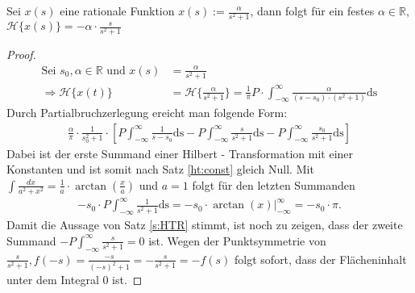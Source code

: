 \begin{lemma}\label{s:HTR} Sei $x(s)$ eine rationale Funktion $x(s) := \frac{\alpha}{s^2+1}$, dann folgt für ein festes $\alpha \in \mathbb{R}$, $\mathscr{H}\{x(s)\} = -\alpha \cdot \frac{s}{s^2+1}$
\begin{proof}
\begin{align}
\text{Sei } s_0, \alpha \in \mathbb{R} \text{ und } x(s) &= \frac{\alpha}{s^2+1}\\
\Rightarrow \mathscr{H}\{x(t)\} &= \mathscr{H}\{\frac{\alpha}{s^2+1}\} = \frac{1}{\pi }P  \cdot \int_{-\infty}^{\infty} \frac{\alpha}{(s-s_0)\cdot (s^2+1)} \mathrm{ds}
\end{align}
Durch Partialbruchzerlegung ereicht man folgende Form:
\begin{align}
\frac{\alpha}{\pi } \cdot \frac{1}{s_0^2+1} \cdot \left[ P \int_{-\infty}^{\infty} \frac{1}{s-s_0} \mathrm{ds} - P \int_{-\infty}^{\infty} \frac{s}{s^2+1} \mathrm{ds} - P \int_{-\infty}^{\infty} \frac{s_0}{s^2+1} \mathrm{ds} \right]
\end{align}
Dabei ist der erste Summand einer Hilbert - Transformation mit einer Konstanten und ist somit nach Satz \ref{ht:const} gleich Null. Mit $\int \frac{dx}{a^2+x^2} = \frac{1}{a}\cdot \arctan(\frac{x}{a})$ \cite{Formeln2010} und $a=1$  folgt für den letzten Summanden\\
\begin{align}
-s_0 \cdot P \int_{-\infty}^{\infty} \frac{1}{s^2+1} \mathrm{ds} = -s_0 \cdot \left. \arctan{(x)}\right|_{-\infty}^{\infty} = -s_0 \cdot \pi \text{.}
\end{align}
Damit die Aussage von Satz \ref{s:HTR} stimmt, ist noch zu zeigen, dass der zweite Summand 
$-P \int_{-\infty}^{\infty} \frac{s}{s^2+1} = 0$ ist. Wegen der Punktsymmetrie von $\frac{s}{s^2+1}, f(-s) = \frac{-s}{(-s)^2+1} = -\frac{s}{s^2+1} = -f(s)$ folgt sofort, dass der Flächeninhalt unter dem Integral 0 ist.
\end{proof}
\end{lemma}